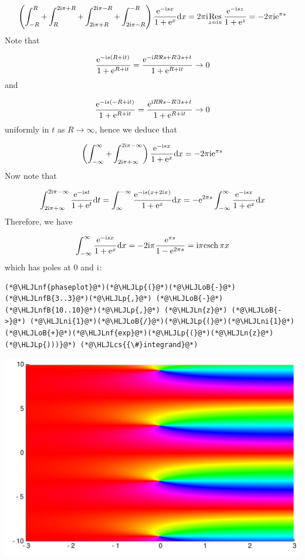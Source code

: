 \documentclass[12pt,a4paper]{article}
\newcommand{\HLJLn}[1]{#1}
\newcommand{\HLJLnf}[1]{\textcolor[RGB]{66,102,213}{#1}}
\newcommand{\HLJLnfB}[1]{\textcolor[RGB]{59,151,46}{#1}}
\newcommand{\HLJLni}[1]{\textcolor[RGB]{59,151,46}{#1}}
\newcommand{\HLJLoB}[1]{\textcolor[RGB]{102,102,102}{\textbf{#1}}}
\newcommand{\HLJLp}[1]{#1}
\newcommand{\HLJLcs}[1]{\textcolor[RGB]{153,153,119}{\textit{#1}}}
\def\D{ {\rm d} }
\def\I{ {\rm i} }
\def\E{ {\rm e} }
\def\Res_#1{\underset{#1}{\rm Res}\,}
\def\dx{\D x}
\def\dt{\D t}
\begin{document}
\[
\left(\int_{-R}^R + \int_R^{2\I \pi + R} +  \int_{2 \I \pi + R}^{2\I \pi - R} + \int_{2 \I \pi - R}^{-R} \right) {\E^{-\I s x} \over 1 + \E^x} \dx = 2 \pi \I \Res_{z = \I \pi } {\E^{-\I s z} \over 1 + \E^z} = 
- 2 \pi \I \E^{\pi s}
\]
Note that 

\[
{\E^{-\I s (R + \I t)} \over 1 + \E^{R + \I t}} = 
{\E^{-\I R \Re s + R \Im s  + t} \over 1 + \E^{R + \I t}} \rightarrow 0
\]
and

\[
{\E^{-\I s (-R + \I t)} \over 1 + \E^{R + \I t}} = 
{\E^{\I R \Re s - R \Im s + t} \over 1 + \E^{R + \I t}} \rightarrow 0
\]
uniformly in $t$ as $R \rightarrow \infty$, hence we deduce that

\[
\left(\int_{-\infty}^\infty  +  \int_{2 \I \pi + \infty}^{2\I \pi - \infty}\right) {\E^{-\I s x} \over 1 + \E^x} \dx  = 
- 2 \pi \I \E^{\pi s}
\]
Now note that

\[
\int_{2 \I \pi + \infty}^{2\I \pi - \infty} {\E^{-\I s t} \over 1 + \E^t} \dt  = \int_{\infty}^{-\infty} {\E^{-\I s (x+2 \I \pi)} \over 1 + \E^x} \dx = -\E^{2 \pi s} \int_{-\infty}^\infty  {\E^{-\I s x} \over 1 + \E^x} \dx 
\]
Therefore, we have

\[
\int_{-\infty}^\infty  {\E^{-\I s x} \over 1 + \E^x} \dx  = - 2 \I \pi {\E^{\pi s} \over 1 -\E^{2 \pi s}} = \I \pi {\rm csch}\, \pi x
\]
which has poles at $0$ and $\I$:


\begin{lstlisting}
(*@\HLJLnf{phaseplot}@*)(*@\HLJLp{(}@*)(*@\HLJLoB{-}@*)(*@\HLJLnfB{3..3}@*)(*@\HLJLp{,}@*) (*@\HLJLoB{-}@*)(*@\HLJLnfB{10..10}@*)(*@\HLJLp{,}@*) (*@\HLJLn{z}@*) (*@\HLJLoB{->}@*) (*@\HLJLni{1}@*)(*@\HLJLoB{/}@*)(*@\HLJLp{(}@*)(*@\HLJLni{1}@*)(*@\HLJLoB{+}@*)(*@\HLJLnf{exp}@*)(*@\HLJLp{(}@*)(*@\HLJLn{z}@*)(*@\HLJLp{)))}@*) (*@\HLJLcs{{\#}integrand}@*)
\end{lstlisting}

\includegraphics[width=\linewidth]{figures/Solutions4_9_1.pdf}
\end{document}
